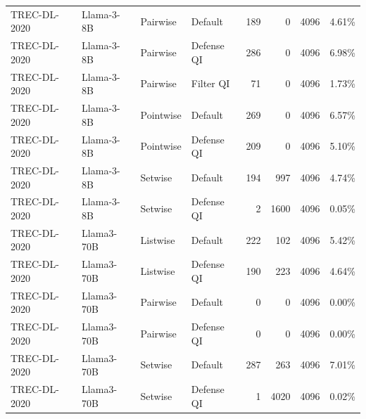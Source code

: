 \begin{table}[t]
\begin{tabular}{ll l l r r r c}
TREC-DL-2020 & Llama-3-8B & Pairwise & Default & 189 & 0 & 4096 & 4.61\% \\
TREC-DL-2020 & Llama-3-8B & Pairwise & Defense QI & 286 & 0 & 4096 & 6.98\% \\
TREC-DL-2020 & Llama-3-8B & Pairwise & Filter QI & 71 & 0 & 4096 & 1.73\% \\
TREC-DL-2020 & Llama-3-8B & Pointwise & Default & 269 & 0 & 4096 & 6.57\% \\
TREC-DL-2020 & Llama-3-8B & Pointwise & Defense QI & 209 & 0 & 4096 & 5.10\% \\
TREC-DL-2020 & Llama-3-8B & Setwise & Default & 194 & 997 & 4096 & 4.74\% \\
TREC-DL-2020 & Llama-3-8B & Setwise & Defense QI & 2 & 1600 & 4096 & 0.05\% \\
TREC-DL-2020 & Llama3-70B & Listwise & Default & 222 & 102 & 4096 & 5.42\% \\
TREC-DL-2020 & Llama3-70B & Listwise & Defense QI & 190 & 223 & 4096 & 4.64\% \\
TREC-DL-2020 & Llama3-70B & Pairwise & Default & 0 & 0 & 4096 & 0.00\% \\
TREC-DL-2020 & Llama3-70B & Pairwise & Defense QI & 0 & 0 & 4096 & 0.00\% \\
TREC-DL-2020 & Llama3-70B & Setwise & Default & 287 & 263 & 4096 & 7.01\% \\
TREC-DL-2020 & Llama3-70B & Setwise & Defense QI & 1 & 4020 & 4096 & 0.02\% \\
\bottomrule
\end{tabular}
\end{table}

